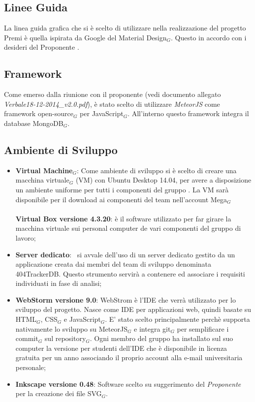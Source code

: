 \subsection{Linee Guida}
La linea guida grafica che si è scelto di utilizzare nella realizzazione del progetto Premi è quella ispirata da Google del Material Design$_G$. Questo in accordo con i desideri del Proponente \Zucchetti.
\subsection{Framework}
Come emerso dalla riunione con il proponente (vedi documento allegato \textit{Verbale18-12-2014\_v2.0.pdf}), è stato scelto di utilizzare \textit{MeteorJS} come framework open-source$_G$ per JavaScript$_G$. All'interno questo framework integra il database MongoDB$_G$.

\subsection{Ambiente di Sviluppo}

\begin{itemize}
	\item \textbf{Virtual Machine$_G$}:
	\smallbreak
	Come ambiente di sviluppo si è scelto di creare una macchina virtuale$_G$ (VM) con Ubuntu Desktop 14.04, per avere a disposizione un ambiente uniforme per tutti i componenti del gruppo \gruppo. La VM sarà disponibile per il download ai componenti del team nell'account Mega$_G$
	\\ \\
	\textbf{Virtual Box versione 4.3.20}: è il software utilizzato per far girare la macchina virtuale sui personal computer de vari componenti del gruppo di lavoro;
	\item \textbf{Server dedicato}:
	\gruppo\ si avvale dell'uso di un server dedicato gestito da un applicazione creata dai membri del team di sviluppo denominata 404TrackerDB. Questo strumento servirà a contenere ed associare i requisiti individuati in fase di analisi;
    \item \textbf{WebStorm versione 9.0}: WebStrom è l'IDE che verrà utilizzato per lo sviluppo del progetto. Nasce come IDE per applicazioni web, quindi basate su HTML$_G$, CSS$_G$ e JavaScript$_G$. E' stato scelto principalmente perchè supporta nativamente lo sviluppo su MeteorJS$_G$ e integra git$_G$ per semplificare i commit$_G$ sul repository$_G$. Ogni membro del gruppo ha installato sul suo computer la versione per studenti dell'IDE che è disponibile in licenza gratuita per un anno associando il proprio account alla e-mail universitaria personale;
    
    \item \textbf{Inkscape versione 0.48}: Software scelto su suggerimento del \textit{Proponente} per la creazione dei file SVG$_G$.
\end{itemize}

